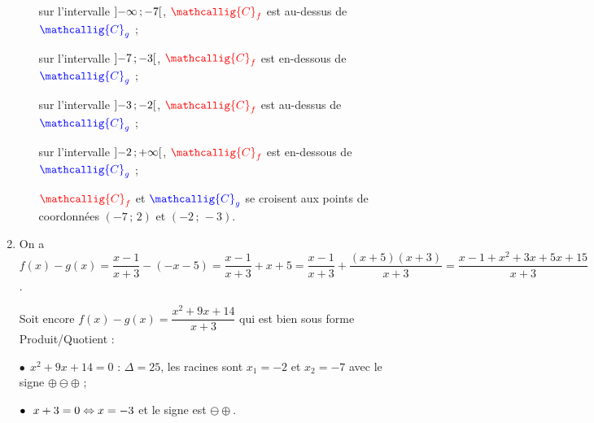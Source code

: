 \documentclass[a4paper,11pt]{article}
\begin{document}
\begin{enumerate}
\begin{enumerate}
		\tabula{} sur l'intervalle $\mbox{\ensuremath{\left]-\infty\mathpunct{};-7\right[}}$, $\mathcolor{red}{\mathcallig{C}_f}$ est au-dessus de $\mathcolor{blue}{\mathcallig{C}_g}$ ;
		
		\tabula{} sur l'intervalle $\mbox{\ensuremath{\left]-7\mathpunct{};-3\right[}}$, $\mathcolor{red}{\mathcallig{C}_f}$ est en-dessous de $\mathcolor{blue}{\mathcallig{C}_g}$ ;
		
		\tabula{} sur l'intervalle $\mbox{\ensuremath{\left]-3\mathpunct{};-2\right[}}$, $\mathcolor{red}{\mathcallig{C}_f}$ est au-dessus de $\mathcolor{blue}{\mathcallig{C}_g}$ ;
		
		\tabula{} sur l'intervalle $\mbox{\ensuremath{\left]-2\mathpunct{};+\infty\right[}}$, $\mathcolor{red}{\mathcallig{C}_f}$ est en-dessous de $\mathcolor{blue}{\mathcallig{C}_g}$ ;
		
		\tabula{}$\mathcolor{red}{\mathcallig{C}_f}$ et $\mathcolor{blue}{\mathcallig{C}_g}$ se croisent aux points de coordonnées $(-7\,;\,2)$ et $(-2\,;\,-3)$.
	\end{enumerate}
	\item On a $f(x)-g(x) = \dfrac{x-1}{x+3}-(-x-5) = \dfrac{x-1}{x+3}+x+5=\dfrac{x-1}{x+3}+\dfrac{(x+5)(x+3)}{x+3}= \dfrac{x-1+x^2+3x+5x+15}{x+3}$.
	
	Soit encore $f(x)-g(x) = \dfrac{x^2+9x+14}{x+3}$ qui est bien sous forme \textsf{Produit/Quotient} :
	
	\tabula{}$\bullet~~x^2+9x+14=0$ : $\Delta=25$, les racines sont $x_1=-2$ et $x_2=-7$ avec le signe $\oplus\ominus\oplus$ ;
	
	\tabula{}$\bullet~~x+3=0 \Leftrightarrow x=-3$ et le signe est $\ominus\oplus$.
	
	\begin{center}
	\end{center}
\end{enumerate}
\end{document}
